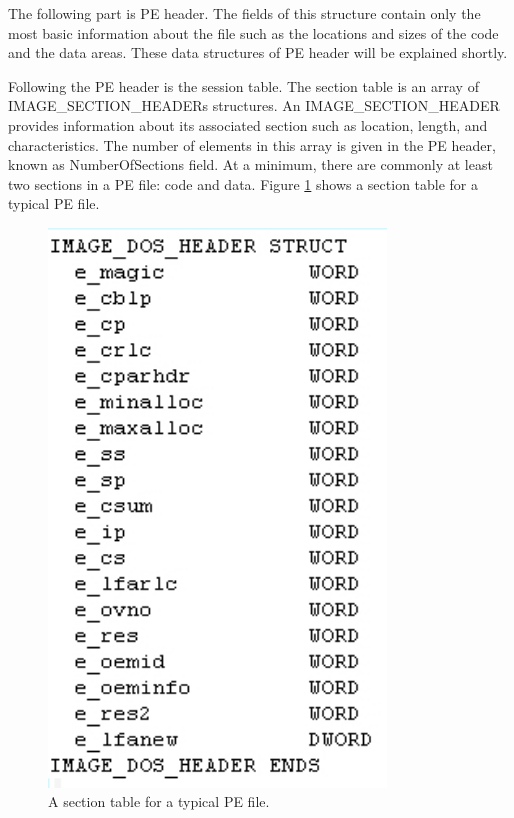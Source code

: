 The following part is PE header. The fields of this structure contain only the most basic information about the file such as the locations and sizes of the code and the data areas. These data structures of PE header will be explained shortly.

Following the PE header is the session table. The section table is an array of IMAGE\_SECTION\_HEADERs structures. An IMAGE\_SECTION\_HEADER provides information about its associated section such as location, length, and characteristics. The number of elements in this array is given in the PE header, known as NumberOfSections field. At a minimum, there are commonly at least two sections in a PE file: code and data. Figure \ref{fig:pefiles1} shows a section table for a typical PE file.

\begin{figure}[h!]
\centering
\includegraphics[width=0.8\textwidth]{graph/dosHeaderStructure.png}
\caption{A section table for a typical PE file.}
\label{fig:pefiles1}
\end{figure}

